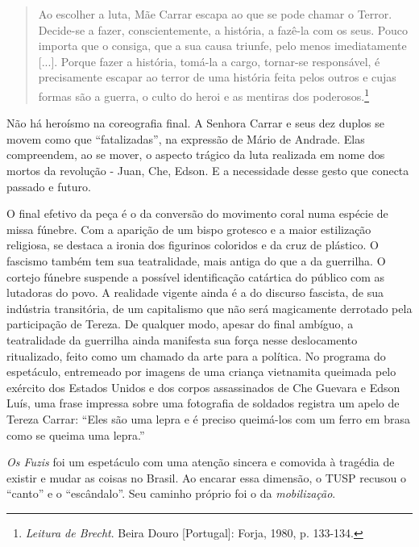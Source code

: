 \begin{quote}
Ao escolher a luta, Mãe Carrar escapa ao que se pode chamar o Terror.
Decide-se a fazer, conscientemente, a história, a fazê-la com os seus.
Pouco importa que o consiga, que a sua causa triunfe, pelo menos
imediatamente {[}...{]}. Porque fazer a história, tomá-la a cargo,
tornar-se responsável, é precisamente escapar ao terror de uma história
feita pelos outros e cujas formas são a guerra, o culto do heroi e as
mentiras dos poderosos.\footnote{\textit{Leitura de Brecht}. Beira Douro
  {[}Portugal{]}: Forja, 1980, p. 133-134.}
\end{quote}

Não há heroísmo na coreografia final. A Senhora Carrar e seus dez duplos
se movem como que “fatalizadas”, na expressão de Mário de Andrade. Elas
compreendem, ao se mover, o aspecto trágico da luta realizada em nome
dos mortos da revolução - Juan, Che, Edson. E a necessidade desse gesto
que conecta passado e futuro.

O final efetivo da peça é o da conversão do movimento coral numa espécie
de missa fúnebre. Com a aparição de um bispo grotesco e a maior
estilização religiosa, se destaca a ironia dos figurinos coloridos e da
cruz de plástico. O fascismo também tem sua teatralidade, mais antiga do
que a da guerrilha. O cortejo fúnebre suspende a possível identificação
catártica do público com as lutadoras do povo. A realidade vigente ainda
é a do discurso fascista, de sua indústria transitória, de um
capitalismo que não será magicamente derrotado pela participação de
Tereza. De qualquer modo, apesar do final ambíguo, a teatralidade da
guerrilha ainda manifesta sua força nesse deslocamento ritualizado,
feito como um chamado da arte para a política. No programa do
espetáculo, entremeado por imagens de uma criança vietnamita queimada
pelo exército dos Estados Unidos e dos corpos assassinados de Che
Guevara e Edson Luís, uma frase impressa sobre uma fotografia de
soldados registra um apelo de Tereza Carrar: “Eles são uma lepra e é
preciso queimá-los com um ferro em brasa como se queima uma lepra.”

\textit{Os Fuzis} foi um espetáculo com uma atenção sincera e comovida à
tragédia de existir e mudar as coisas no Brasil. Ao encarar essa
dimensão, o TUSP recusou o “canto” e o “escândalo”. Seu caminho próprio
foi o da \textit{mobilização}.

